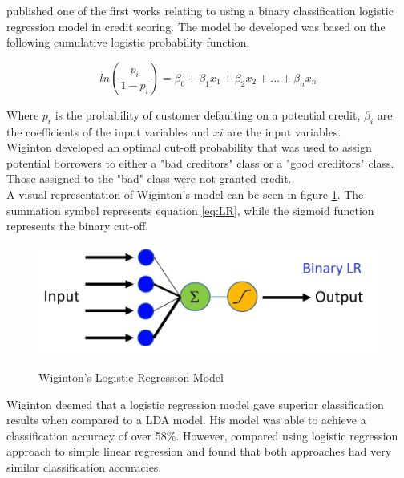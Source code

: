 \textcite{LogRegWiginton} published one of the first works relating to using a binary classification logistic regression model in credit scoring. The model he developed was based on the following cumulative logistic probability function.

\vspace{15pt}

\begin{equation} \label{eq:LR}
ln(\frac{p_{i}}{1-p_{i}}) = \beta_{0} + \beta_{1}x_{1} + \beta_{2}x_{2}+ ... +  \beta_{n}x_{n}
\end{equation}

\vspace{15pt}

Where $p_{i}$ is the probability of customer defaulting on a potential credit, $\beta_{i}$ are the coefficients of the input variables and $x{i}$ are the input variables. \\

Wiginton developed an optimal cut-off probability that was used to assign potential borrowers to either a "bad creditors" class or a "good creditors" class. Those assigned to the "bad" class were not granted credit.  \\

A visual representation of Wiginton's model can be seen in figure \ref{fig:LR}. The summation symbol represents equation \ref{eq:LR}, while the sigmoid function represents the binary cut-off.  

\vspace{15pt}

\begin{figure}[!htb]
\centering
\includegraphics[width = \textwidth]{images/logistic_reg.png}
\caption{Wiginton's Logistic Regression Model}
\parencite{LogRegFig}
\label{fig:LR}
\end{figure}

\vspace{15pt}

Wiginton deemed that a logistic regression model gave superior classification results when compared to a LDA model. His model was able to achieve a classification accuracy of over 58\%. However, \textcite{LogRegHand} compared using logistic regression approach to simple linear regression and found that both approaches had very similar classification accuracies. 


